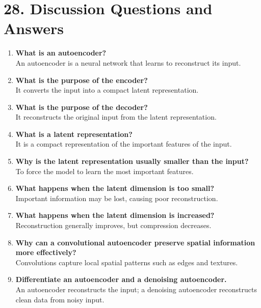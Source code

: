 \documentclass[10pt]{article}
\begin{document}
\section*{28. Discussion Questions and Answers}

\begin{enumerate}

\item \textbf{What is an autoencoder?}\\
An autoencoder is a neural network that learns to reconstruct its input.

\item \textbf{What is the purpose of the encoder?}\\
It converts the input into a compact latent representation.

\item \textbf{What is the purpose of the decoder?}\\
It reconstructs the original input from the latent representation.

\item \textbf{What is a latent representation?}\\
It is a compact representation of the important features of the input.

\item \textbf{Why is the latent representation usually smaller than the input?}\\
To force the model to learn the most important features.

\item \textbf{What happens when the latent dimension is too small?}\\
Important information may be lost, causing poor reconstruction.

\item \textbf{What happens when the latent dimension is increased?}\\
Reconstruction generally improves, but compression decreases.

\item \textbf{Why can a convolutional autoencoder preserve spatial information more effectively?}\\
Convolutions capture local spatial patterns such as edges and textures.

\item \textbf{Differentiate an autoencoder and a denoising autoencoder.}\\
An autoencoder reconstructs the input; a denoising autoencoder reconstructs clean data from noisy input.


\end{enumerate}
\end{document}
